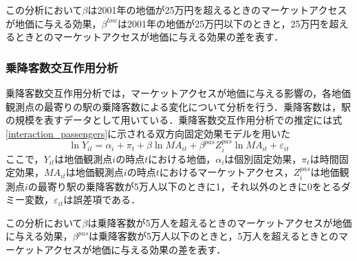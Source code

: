 この分析において$\beta$は2001年の地価が25万円を超えるときのマーケットアクセスが地価に与える効果，$\beta^{low}$は2001年の地価が25万円以下のときと，25万円を超えるときとのマーケットアクセスが地価に与える効果の差を表す．
\subsubsection{乗降客数交互作用分析}
乗降客数交互作用分析では，マーケットアクセスが地価に与える影響の，各地価観測点の最寄りの駅の乗降客数による変化について分析を行う．乗降客数は，駅の規模を表すデータとして用いている．乗降客数交互作用分析での推定には式\ref{interaction_passengers}に示される双方向固定効果モデルを用いた
\begin{equation}
  \ln{Y_{it}} = \alpha_{i} + \pi_{t} + \beta\ln{MA_{it}} + \beta^{pas}Z^{pas}_{i}\ln{MA_{it}} + \varepsilon_{it}
  \label{interaction_passengers}
\end{equation}
ここで，$Y_{it}$は地価観測点$i$の時点$t$における地価，$\alpha_{i}$は個別固定効果，$\pi_{t}$は時間固定効果，$MA_{it}$は地価観測点$i$の時点$t$におけるマーケットアクセス，$Z^{pas}_{i}$は地価観測点$i$の最寄り駅の乗降客数が5万人以下のときに1，それ以外のときに0をとるダミー変数，$\varepsilon_{it}$は誤差項である．

この分析において$\beta$は乗降客数が5万人を超えるときのマーケットアクセスが地価に与える効果，$\beta^{pas}$は乗降客数が5万人以下のときと，5万人を超えるときとのマーケットアクセスが地価に与える効果の差を表す．

